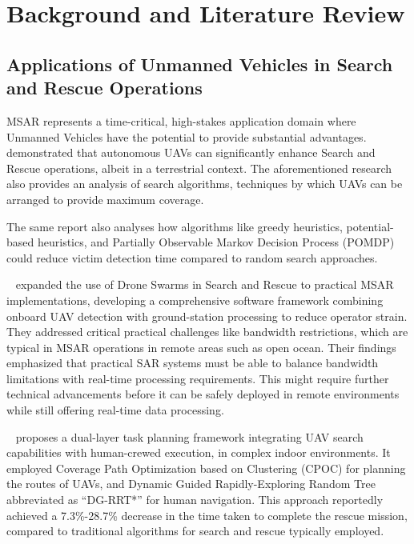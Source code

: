 \section{Background and Literature Review}\label{sec:background-and-literature-review}

\subsection{Applications of Unmanned Vehicles in Search and Rescue Operations}\label{subsec:uav-applications-in-search-and-rescue-operations}
MSAR represents a time-critical, high-stakes application domain where Unmanned Vehicles have the potential to provide substantial advantages.
\citet{waharte2010supporting} demonstrated that autonomous UAVs can significantly enhance Search and Rescue operations, albeit in a terrestrial context.
The aforementioned research also provides an analysis of search algorithms, techniques by which UAVs can be arranged to provide maximum coverage.

The same report also analyses how algorithms like greedy heuristics, potential-based heuristics, and Partially Observable Markov Decision Process (POMDP) could reduce victim detection time compared to random search approaches.

~\cite{messmer2024uav,UAV_USV_SAR} expanded the use of Drone Swarms in Search and Rescue to practical MSAR implementations, developing a comprehensive software framework combining onboard UAV detection with ground-station processing to reduce operator strain.
They addressed critical practical challenges like bandwidth restrictions, which are typical in MSAR operations in remote areas such as open ocean.
Their findings emphasized that practical SAR systems must be able to balance bandwidth limitations with real-time processing requirements.
This might require further technical advancements before it can be safely deployed in remote environments while still offering real-time data processing.

~\cite{YANG2025113488} proposes a dual-layer task planning framework integrating UAV search capabilities with human-crewed execution, in complex indoor environments.
It employed Coverage Path Optimization based on Clustering (CPOC) for planning the routes of UAVs, and Dynamic Guided Rapidly-Exploring Random Tree abbreviated as ``DG-RRT*'' for human navigation.
This approach reportedly achieved a 7.3\%-28.7\% decrease in the time taken to complete the rescue mission, compared to traditional algorithms for search and rescue typically employed.

